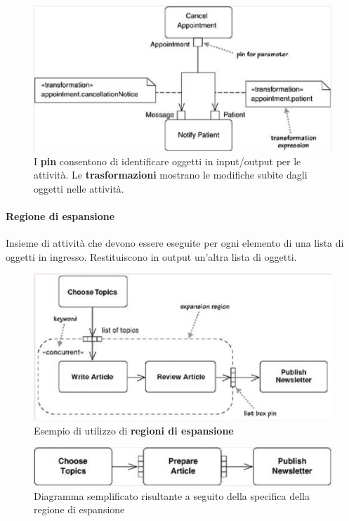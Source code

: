 \begin{figure}[H]
    \centering
    \includegraphics[width=0.75\linewidth]{assets/UML/activity/activity-7.png}
    \caption{I \textbf{pin} consentono di identificare oggetti in input/output per le attività. Le \textbf{trasformazioni} mostrano le modifiche subite dagli oggetti nelle attività.}
\end{figure}

\paragraph{Regione di espansione} Insieme di attività che devono essere eseguite per ogni elemento di una lista di oggetti in ingresso. Restituiscono in output un'altra lista di oggetti.

\begin{figure}[H]
    \centering
    \includegraphics[width=0.8\linewidth]{assets/UML/activity/activity-8.png}
    \caption{Esempio di utilizzo di \textbf{regioni di espansione}}
\end{figure}

\begin{figure}[H]
    \centering
    \includegraphics[width=0.8\linewidth]{assets/UML/activity/activity-9.png}
    \caption{Diagramma semplificato risultante a seguito della specifica della regione di espansione}
\end{figure}

\newpage